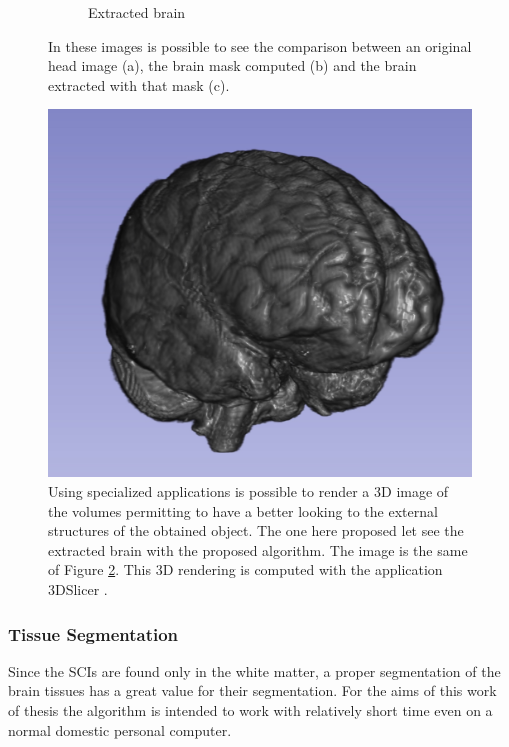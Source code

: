 \documentclass{standalone}
\begin{document}
\begin{figure}[h!]
\begin{subfigure}[b]{0.325\textwidth}
             \caption{Extracted brain}
             \label{fig:brain}
        \end{subfigure}
		\caption{In these images is possible to see the comparison between an original head image (a), the brain mask computed (b) and the brain extracted with that mask (c). }
		\label{fig:skull_stripping}
	\end{figure} 
	

\begin{figure}[h!]
    \centering
             \includegraphics[scale=0.32]{img/Chap2/3Dbrain.jpg}
		\caption{Using specialized applications is possible to render a 3D image of the volumes permitting to have a better looking to the external structures of the obtained object. The one here proposed let see the extracted brain with the proposed algorithm. The image is the same of Figure \ref{fig:skull_stripping}. This 3D rendering is computed with the application 3DSlicer \cite{3DSlicer}.}
		\label{fig:skull_stripping_3d}
	\end{figure} 





\subsubsection{Tissue Segmentation}

Since the SCIs are found only in the white matter, a proper segmentation of the brain tissues has a great value for their segmentation. 
For the aims of this work of thesis the algorithm is intended to work with relatively short time even on a normal domestic personal computer.
\end{document}
